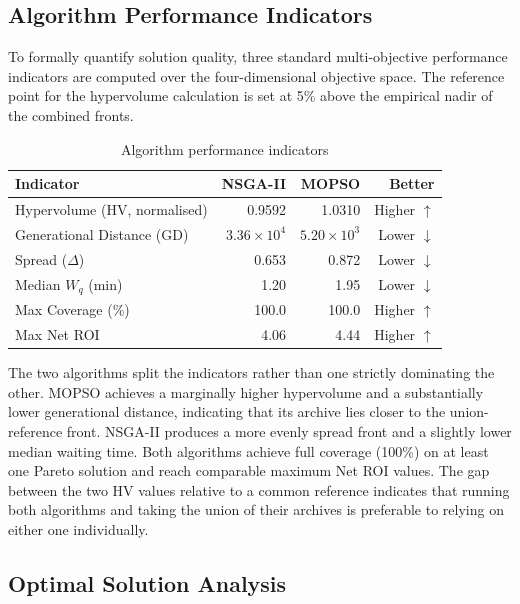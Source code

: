 \subsection{Algorithm Performance Indicators}

To formally quantify solution quality, three standard
multi-objective performance indicators are computed over the
four-dimensional objective space. The reference point for the
hypervolume calculation is set at 5\% above the empirical nadir of
the combined fronts.

\begin{table}[H]
\centering
\caption{Algorithm performance indicators}
\label{tab:performance}
\begin{tabular}{lrrr}
\toprule
Indicator & NSGA-II & MOPSO & Better \\
\midrule
Hypervolume (HV, normalised)        & 0.9592  & 1.0310  & Higher $\uparrow$ \\
Generational Distance (GD)          & $3.36 \times 10^{4}$ & $5.20 \times 10^{3}$ & Lower $\downarrow$ \\
Spread ($\Delta$)                   & 0.653   & 0.872   & Lower $\downarrow$ \\
Median $W_q$ (min)                  & 1.20    & 1.95    & Lower $\downarrow$ \\
Max Coverage (\%)                   & 100.0   & 100.0   & Higher $\uparrow$ \\
Max Net ROI                         & 4.06    & 4.44    & Higher $\uparrow$ \\
\bottomrule
\end{tabular}
\end{table}

The two algorithms split the indicators rather than one strictly
dominating the other. MOPSO achieves a marginally higher
hypervolume and a substantially lower generational distance,
indicating that its archive lies closer to the union-reference
front. NSGA-II produces a more evenly spread front and a slightly
lower median waiting time. Both algorithms achieve full coverage
(100\%) on at least one Pareto solution and reach comparable
maximum Net ROI values. The gap between the two HV values relative
to a common reference indicates that running both algorithms and
taking the union of their archives is preferable to relying on
either one individually.

\subsection{Optimal Solution Analysis}

